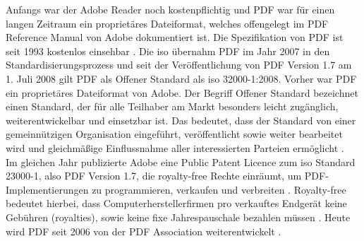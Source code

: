 Anfangs war der Adobe Reader noch kostenpflichtig und PDF war für einen langen Zeitraum ein proprietäres Dateiformat, welches offengelegt im PDF Reference Manual von Adobe dokumentiert ist. Die Spezifikation von PDF ist seit 1993 kostenlos einsehbar \cite{wiki-pdf-engl}. Die \gls{iso} übernahm PDF im Jahr 2007 in den Standardisierungsprozess und seit der Veröffentlichung von PDF Version 1.7 am 1. Juli 2008 gilt PDF als Offener Standard als \gls{iso} 32000-1:2008\cite{wiki-pdf-de, wiki-pdf-engl}. Vorher war PDF ein proprietäres Dateiformat von Adobe. Der Begriff Offener Standard bezeichnet einen Standard, der für alle Teilhaber am Markt besonders leicht zugänglich, weiterentwickelbar und einsetzbar ist. Das bedeutet, dass der Standard von einer gemeinnützigen Organisation eingeführt, veröffentlicht sowie weiter bearbeitet wird und gleichmäßige Einflussnahme aller interessierten Parteien ermöglicht \cite{wiki-standard}. \\
Im gleichen Jahr publizierte Adobe eine Public Patent Licence zum \gls{iso} Standard 23000-1, also PDF Version 1.7, die royalty-free Rechte einräumt, um PDF-Implementierungen zu programmieren, verkaufen und verbreiten \cite{wiki-pdf-engl}. Royalty-free bedeutet hierbei, dass Computerherstellerfirmen pro verkauftes Endgerät keine Gebühren (royalties), sowie keine fixe Jahrespauschale bezahlen müssen \cite{wiki-roy-free}.  Heute wird PDF seit 2006 von der PDF Association weiterentwickelt \cite{wiki-pdf-de}. 









